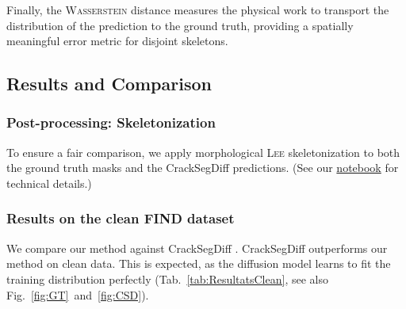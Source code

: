 \documentclass[conference]{IEEEtran}
\begin{document}
Finally, the \textsc{Wasserstein} distance \cite{Wasserstein} measures the physical work to transport the distribution of the prediction to the ground truth, providing a spatially meaningful error metric for disjoint skeletons.

\subsection{Results and Comparison}

\subsubsection{Post-processing: Skeletonization}


To ensure a fair comparison, we apply morphological \textsc{Lee} skeletonization \cite{SciKitSkeletonization} to both the ground truth masks and the CrackSegDiff predictions. (See our \href{https://colab.research.google.com/github/Ayana-Inria/Generalized-Frangi-for-Automatic-Crack-Extraction-on-FIND-dataset/blob/main/FIND_Frangi_Fusion_Avignon_Colab.ipynb}{notebook} for technical details.)



\subsubsection{Results on the clean FIND dataset}

We compare our method against CrackSegDiff \cite{CrackSegDiff2024}. %
CrackSegDiff outperforms our method on clean data. This is expected, as the diffusion model learns to fit the training distribution perfectly (Tab.~\ref{tab:ResultatsClean}, see also Fig.~\ref{fig:GT}~and~\ref{fig:CSD}).  



\end{document}
